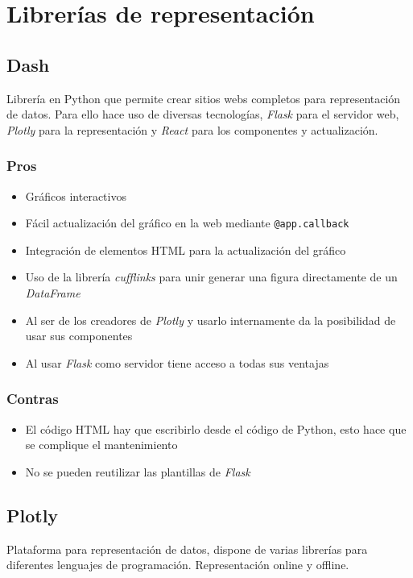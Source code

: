 
\section{Librerías de representación}

\subsection{Dash}
Librería en Python que permite crear sitios webs completos para representación de datos. Para ello hace uso de diversas tecnologías, \textit{Flask} para el servidor web, \textit{Plotly} para la representación y \textit{React} para los componentes y actualización.
\subsubsection{Pros}
\begin{itemize}
	\item Gráficos interactivos
	\item Fácil actualización del gráfico en la web mediante \verb|@app.callback|
	\item Integración de elementos HTML para la actualización del gráfico
	\item Uso de la librería \textit{cufflinks} para unir generar una figura directamente de un \textit{DataFrame}
	\item Al ser de los creadores de \textit{Plotly} y usarlo internamente da la posibilidad de usar sus componentes
	\item Al usar \textit{Flask} como servidor tiene acceso a todas sus ventajas
\end{itemize}
\subsubsection{Contras}
\begin{itemize}
	\item El código HTML hay que escribirlo desde el código de Python, esto hace que se complique el mantenimiento
	\item No se pueden reutilizar las plantillas de \textit{Flask}
\end{itemize}

\subsection{Plotly}
Plataforma para representación de datos, dispone de varias librerías para diferentes lenguajes de programación. Representación online y offline.
